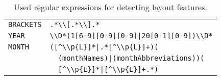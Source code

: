\begin{table}[h!]
\begin{tabular}{l l}
   \texttt{BRACKETS}        &\verb$.*\\[.*\\].*$\\
   \texttt{YEAR}            &\verb$\\D*(1[6-9][0-9][0-9]|20[0-1][0-9])\\D*$\\
   \texttt{MONTH}           &\verb$([^\\p{L}]*|.*[^\\p{L}]+)($\\
                            &\verb$  (monthNames)|(monthAbbreviations))($\\
                            &\verb$  [^\\p{L}]*|[^\\p{L}]+.*)$\\
  \bottomrule
\end{tabular}
\caption{Used regular expressions for detecting layout features.}
\label{tab:our-features-regular-expressions}
\end{table}

